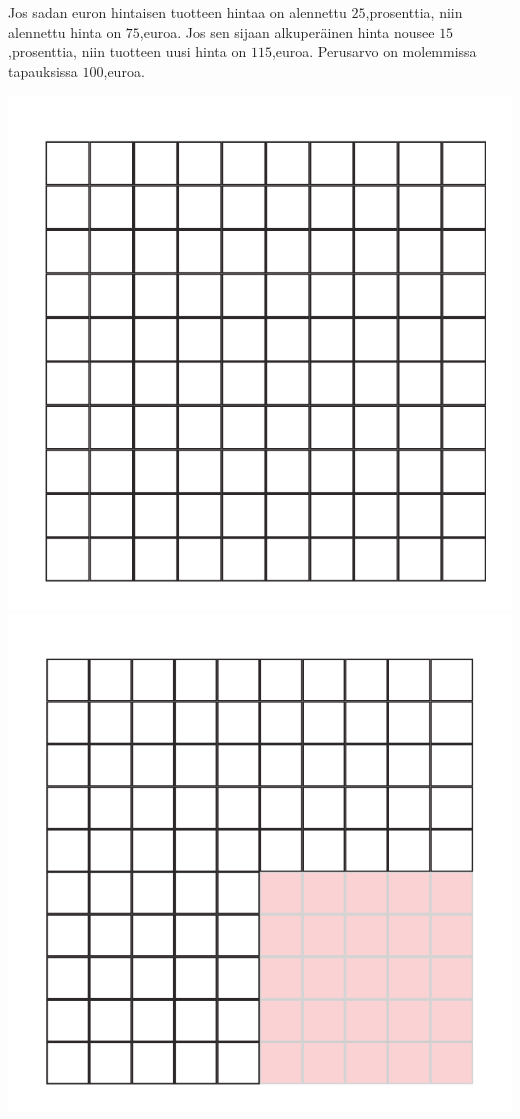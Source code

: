 
\begin{esimerkki}
    Jos sadan euron hintaisen tuotteen hintaa on alennettu $25$,prosenttia,
    niin alennettu hinta on $75$,euroa. Jos sen sijaan alkuperäinen
    hinta nousee $15$,prosenttia, niin tuotteen uusi hinta on $115$,euroa.
    Perusarvo on molemmissa tapauksissa $100$,euroa.
    
    \begin{center}
        \includegraphics[scale=.25]{pictures/Kuva13-1-100.pdf}
        \includegraphics[scale=.25]{pictures/Kuva13-2-75.pdf}

\end{center}
\end{esimerkki}
